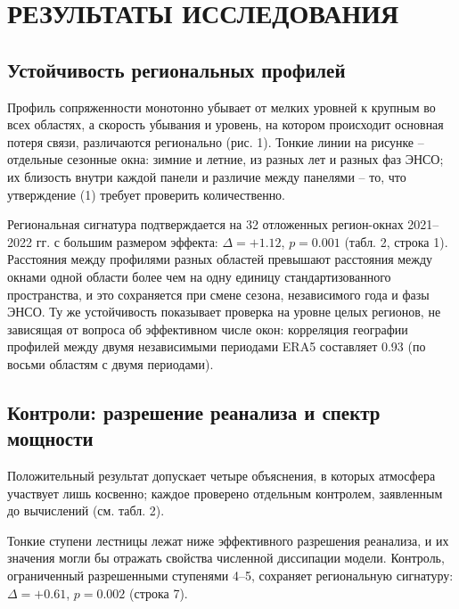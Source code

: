 \documentclass[12pt,a4paper]{article}
\begin{document}
\section{РЕЗУЛЬТАТЫ ИССЛЕДОВАНИЯ}

\subsection{Устойчивость региональных профилей}

Профиль сопряженности монотонно убывает от мелких уровней к крупным во всех областях, а скорость убывания и уровень, на котором происходит основная потеря связи, различаются регионально (рис. 1). Тонкие линии на рисунке -- отдельные сезонные окна: зимние и летние, из разных лет и разных фаз ЭНСО; их близость внутри каждой панели и различие между панелями -- то, что утверждение (1) требует проверить количественно.

Региональная сигнатура подтверждается на 32 отложенных регион-окнах 2021--2022 гг. с большим размером эффекта: $\Delta = +1.12$, $p = 0.001$ (табл. 2, строка 1). Расстояния между профилями разных областей превышают расстояния между окнами одной области более чем на одну единицу стандартизованного пространства, и это сохраняется при смене сезона, независимого года и фазы ЭНСО. Ту же устойчивость показывает проверка на уровне целых регионов, не зависящая от вопроса об эффективном числе окон: корреляция географии профилей между двумя независимыми периодами ERA5 составляет 0.93 (по восьми областям с двумя периодами).

\subsection{Контроли: разрешение реанализа и спектр мощности}

Положительный результат допускает четыре объяснения, в которых атмосфера участвует лишь косвенно; каждое проверено отдельным контролем, заявленным до вычислений (см. табл. 2).

Тонкие ступени лестницы лежат ниже эффективного разрешения реанализа, и их значения могли бы отражать свойства численной диссипации модели. Контроль, ограниченный разрешенными ступенями 4--5, сохраняет региональную сигнатуру: $\Delta = +0.61$, $p = 0.002$ (строка 7).
\end{document}

